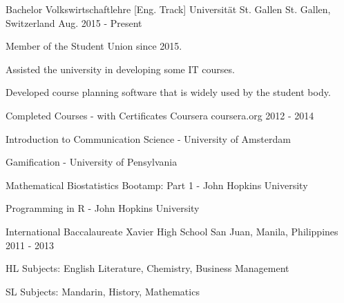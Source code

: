\begin{cventries}

  \cventry
    {Bachelor Volkswirtschaftlehre [Eng. Track]} %
    {Universität St. Gallen} %
    {St. Gallen, Switzerland} %
    {Aug. 2015 - Present} %
    {} %
    {
      \begin{cvitems} %
        \item {Member of the Student Union since 2015.}
        \item {Assisted the university in developing some IT courses.}
        \item {Developed course planning software that is widely used by the student body.}
      \end{cvitems}
    }

  \cventry
  {Completed Courses - with Certificates} %
  {Coursera} %
  {coursera.org} %
  {2012 - 2014} %
  {} %
  {
    \begin{cvitems} %
        \item {Introduction to Communication Science - University of Amsterdam}
        \item {Gamification - University of Pensylvania}
        \item {Mathematical Biostatistics Bootamp: Part 1 - John Hopkins University}
        \item {Programming in R - John Hopkins University}
    \end{cvitems}
  }

  \cventry
    {International Baccalaureate} %
    {Xavier High School} %
    {San Juan, Manila, Philippines} %
    {2011 - 2013} %
    {} %
    {
      \begin{cvitems} %
        \item {HL Subjects: English Literature, Chemistry, Business Management }
        \item {SL Subjects: Mandarin, History, Mathematics }
      \end{cvitems}
    }

\end{cventries}
